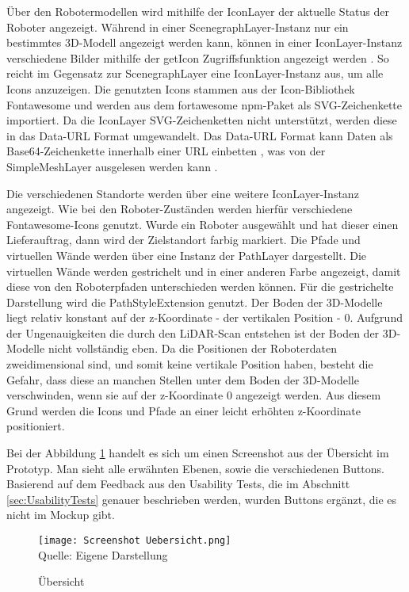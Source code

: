 Über den Robotermodellen wird mithilfe der IconLayer der aktuelle Status der Roboter angezeigt. Während in einer ScenegraphLayer-Instanz nur ein bestimmtes 3D-Modell angezeigt werden kann, können in einer IconLayer-Instanz verschiedene Bilder mithilfe der getIcon Zugriffsfunktion angezeigt werden \cite{DeckglIconLayer}. So reicht im Gegensatz zur ScenegraphLayer eine IconLayer-Instanz aus, um alle Icons anzuzeigen. Die genutzten Icons stammen aus der Icon-Bibliothek Fontawesome und werden aus dem fortawesome \ac{npm}-Paket als \ac{SVG}-Zeichenkette importiert. Da die IconLayer \ac{SVG}-Zeichenketten nicht unterstützt, werden diese in das Data-\ac{URL} Format umgewandelt. Das Data-\ac{URL} Format kann Daten als \gls{Base64}-Zeichenkette innerhalb einer \ac{URL} einbetten \cite{DataUrlSpec}, was von der SimpleMeshLayer ausgelesen werden kann \cite{DeckglIconLayer}.

Die verschiedenen Standorte werden über eine weitere IconLayer-Instanz angezeigt. Wie bei den Roboter-Zuständen werden hierfür verschiedene Fontawesome-Icons genutzt. Wurde ein Roboter ausgewählt und hat dieser einen Lieferauftrag, dann wird der Zielstandort farbig markiert. Die Pfade und virtuellen Wände werden über eine Instanz der PathLayer \cite{DeckglPathLayer} dargestellt. Die virtuellen Wände werden gestrichelt und in einer anderen Farbe angezeigt, damit diese von den Roboterpfaden unterschieden werden können. Für die gestrichelte Darstellung wird die PathStyleExtension \cite{DeckglPathStyleExtension} genutzt. Der Boden der 3D-Modelle liegt relativ konstant auf der z-Koordinate - der vertikalen Position - 0. Aufgrund der Ungenauigkeiten die durch den \ac{LiDAR}-Scan entstehen ist der Boden der 3D-Modelle nicht vollständig eben. Da die Positionen der Roboterdaten zweidimensional sind, und somit keine vertikale Position haben, besteht die Gefahr, dass diese an manchen Stellen unter dem Boden der 3D-Modelle verschwinden, wenn sie auf der z-Koordinate 0 angezeigt werden. Aus diesem Grund werden die Icons und Pfade an einer leicht erhöhten z-Koordinate positioniert.

Bei der Abbildung \ref{fig:OverviewScreenshot} handelt es sich um einen Screenshot aus der Übersicht im Prototyp. Man sieht alle erwähnten Ebenen, sowie die verschiedenen Buttons. Basierend auf dem Feedback aus den Usability Tests, die im Abschnitt \ref{sec:UsabilityTests} genauer beschrieben werden, wurden Buttons ergänzt, die es nicht im Mockup gibt.

\begin{figure}[H]
    \caption{Übersicht}\label{fig:OverviewScreenshot}
    \texttt{[image: Screenshot Uebersicht.png]}
    \\
    Quelle: Eigene Darstellung
\end{figure}

